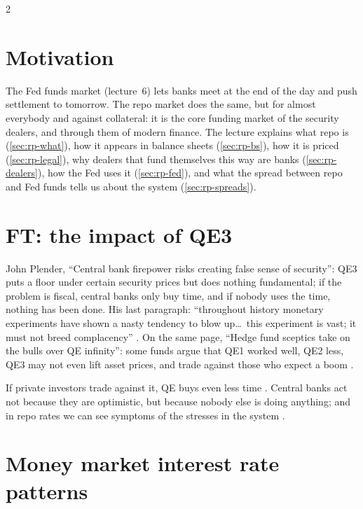 \begin{paracol}{2}
\section*{Motivation}
The Fed funds market (lecture~6) lets banks meet at the end of the day and push settlement to tomorrow. The repo market does the same, but for
almost everybody and against collateral: it is the core funding market of the security dealers, and through them of modern finance. The lecture
explains what repo is (\cref{sec:rp-what}), how it appears in balance sheets (\cref{sec:rp-bs}), how it is priced (\cref{sec:rp-legal}), why
dealers that fund themselves this way are banks (\cref{sec:rp-dealers}), how the Fed uses it (\cref{sec:rp-fed}), and what the spread between repo
and Fed funds tells us about the system (\cref{sec:rp-spreads}).

\section{FT: the impact of QE3}\label{sec:rp-ft}

\begin{casestudy}
John Plender, ``Central bank firepower risks creating false sense of security'': QE3 puts a floor under certain security prices but does nothing
fundamental; if the problem is fiscal, central banks only buy time, and if nobody uses the time, nothing has been done. His last paragraph:
``throughout history monetary experiments have shown a nasty tendency to blow up\dots\ this experiment is vast; it must not breed complacency''
. On the same page, ``Hedge fund sceptics take on the bulls over QE infinity'': some funds argue that QE1
worked well, QE2 less, QE3 may not even lift asset prices, and trade against those who expect a boom .
\end{casestudy}
If private investors trade against it, QE buys even less time . Central banks act not because they are optimistic, but because
nobody else is doing anything; and in repo rates we can see symptoms of the stresses in the system .

\section{Money market interest rate patterns}\label{sec:rp-patterns}


\end{paracol}
